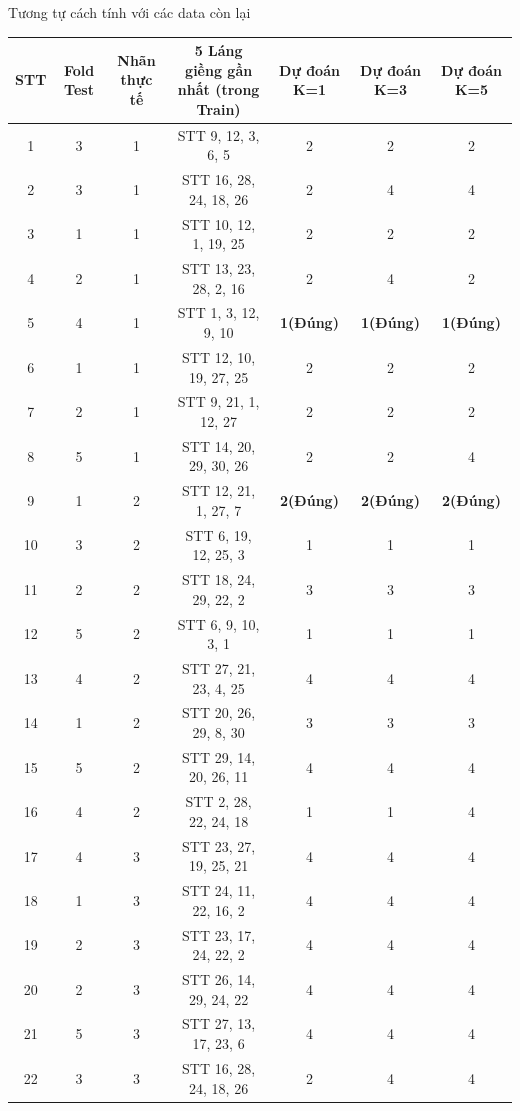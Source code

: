\documentclass[12pt,a4paper]{article}
\begin{document}
Tương tự cách tính với các data còn lại
\begin{table}[H]
\centering
\scriptsize
\renewcommand{\arraystretch}{0.75}
\begin{tabular}{|c|c|c|c|c|c|c|}
\hline
\textbf{STT} & \textbf{Fold Test} & \textbf{Nhãn thực tế} & \textbf{5 Láng giềng gần nhất (trong Train)} & \textbf{Dự đoán K=1} & \textbf{Dự đoán K=3} & \textbf{Dự đoán K=5} \\ \hline
1 & 3 & 1 & STT 9, 12, 3, 6, 5 & 2 & 2 & 2 \\ \hline
2 & 3 & 1 & STT 16, 28, 24, 18, 26 & 2 & 4 & 4 \\ \hline
3 & 1 & 1 & STT 10, 12, 1, 19, 25 & 2 & 2 & 2 \\ \hline
4 & 2 & 1 & STT 13, 23, 28, 2, 16 & 2 & 4 & 2 \\ \hline
5 & 4 & 1 & STT 1, 3, 12, 9, 10 & \textbf{1(Đúng)} & \textbf{1(Đúng)} & \textbf{1(Đúng)} \\ \hline
6 & 1 & 1 & STT 12, 10, 19, 27, 25 & 2 & 2 & 2 \\ \hline
7 & 2 & 1 & STT 9, 21, 1, 12, 27 & 2 & 2 & 2 \\ \hline
8 & 5 & 1 & STT 14, 20, 29, 30, 26 & 2 & 2 & 4 \\ \hline
9 & 1 & 2 & STT 12, 21, 1, 27, 7 & \textbf{2(Đúng)} & \textbf{2(Đúng)} & \textbf{2(Đúng)} \\ \hline
10 & 3 & 2 & STT 6, 19, 12, 25, 3 & 1 & 1 & 1 \\ \hline
11 & 2 & 2 & STT 18, 24, 29, 22, 2 & 3 & 3 & 3 \\ \hline
12 & 5 & 2 & STT 6, 9, 10, 3, 1 & 1 & 1 & 1 \\ \hline
13 & 4 & 2 & STT 27, 21, 23, 4, 25 & 4 & 4 & 4 \\ \hline
14 & 1 & 2 & STT 20, 26, 29, 8, 30 & 3 & 3 & 3 \\ \hline
15 & 5 & 2 & STT 29, 14, 20, 26, 11 & 4 & 4 & 4 \\ \hline
16 & 4 & 2 & STT 2, 28, 22, 24, 18 & 1 & 1 & 4 \\ \hline
17 & 4 & 3 & STT 23, 27, 19, 25, 21 & 4 & 4 & 4 \\ \hline
18 & 1 & 3 & STT 24, 11, 22, 16, 2 & 4 & 4 & 4 \\ \hline
19 & 2 & 3 & STT 23, 17, 24, 22, 2 & 4 & 4 & 4 \\ \hline
20 & 2 & 3 & STT 26, 14, 29, 24, 22 & 4 & 4 & 4 \\ \hline
21 & 5 & 3 & STT 27, 13, 17, 23, 6 & 4 & 4 & 4 \\ \hline
22 & 3 & 3 & STT 16, 28, 24, 18, 26 & 2 & 4 & 4 \\ \hline

\end{tabular}
\end{table}
\end{document}
